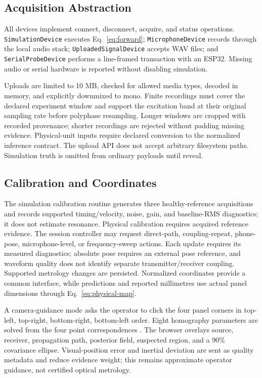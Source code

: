 \documentclass[conference]{IEEEtran}
\newcommand{\code}[1]{\texttt{#1}}
\begin{document}
\subsection{Acquisition Abstraction}
All devices implement connect, disconnect, acquire, and status operations. \code{SimulationDevice} executes Eq.~\eqref{eq:forward}; \code{MicrophoneDevice} records through the local audio stack; \code{UploadedSignalDevice} accepts WAV files; and \code{SerialProbeDevice} performs a line-framed transaction with an ESP32. Missing audio or serial hardware is reported without disabling simulation.

Uploads are limited to 10 MB, checked for allowed media types, decoded in memory, and explicitly downmixed to mono. Finite recordings must cover the declared experiment window and support the excitation band at their original sampling rate before polyphase resampling. Longer windows are cropped with recorded provenance; shorter recordings are rejected without padding missing evidence. Physical-unit inputs require declared conversion to the normalized inference contract. The upload API does not accept arbitrary filesystem paths. Simulation truth is omitted from ordinary payloads until reveal.

\subsection{Calibration and Coordinates}
The simulation calibration routine generates three healthy-reference acquisitions and records supported timing/velocity, noise, gain, and baseline-RMS diagnostics; it does not estimate resonance. Physical calibration requires acquired reference evidence. The session controller may request direct-path, coupling-repeat, phone-pose, microphone-level, or frequency-sweep actions. Each update requires its measured diagnostics; absolute pose requires an external pose reference, and waveform quality does not identify separate transmitter/receiver coupling. Supported metrology changes are persisted. Normalized coordinates provide a common interface, while predictions and reported millimetres use actual panel dimensions through Eq.~\eqref{eq:physical-map}.

A camera-guidance mode asks the operator to click the four panel corners in top-left, top-right, bottom-right, bottom-left order. Eight homography parameters are solved from the four point correspondences \cite{hartley2004}. The browser overlays source, receiver, propagation path, posterior field, suspected region, and a 90\% covariance ellipse. Visual-position error and inertial deviation are sent as quality metadata and reduce evidence weight; this remains approximate operator guidance, not certified optical metrology.
\end{document}
